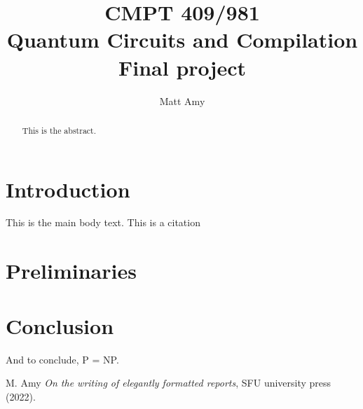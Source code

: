 \documentclass[11pt]{article}
\title{CMPT 409/981 \\ Quantum Circuits and Compilation \\ Final project}
\author{Matt Amy}
\theoremstyle{definition}
\begin{document}
\maketitle

\begin{abstract}

This is the abstract.


\end{abstract}

\section{Introduction}

This is the main body text. This is a citation \cite{A22}

\section{Preliminaries}

\section{Conclusion}

And to conclude, P = NP.

\begin{thebibliography}{2}




 M. Amy \emph{On the writing of elegantly formatted reports},   
SFU university press (2022).

\end{thebibliography}
\end{document}
